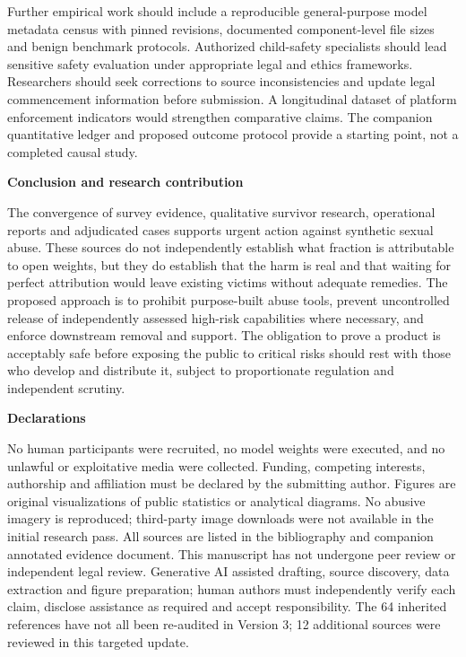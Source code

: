\documentclass[10pt,a4paper]{article}
\newcommand{\sub}[1]{\vspace{1mm}\textbf{#1}\par}
\begin{document}
Further empirical work should include a reproducible general-purpose model metadata census with pinned revisions, documented component-level file sizes and benign benchmark protocols. Authorized child-safety specialists should lead sensitive safety evaluation under appropriate legal and ethics frameworks. Researchers should seek corrections to source inconsistencies and update legal commencement information before submission. A longitudinal dataset of platform enforcement indicators would strengthen comparative claims. The companion quantitative ledger and proposed outcome protocol provide a starting point, not a completed causal study.


\sub{Conclusion and research contribution}
The convergence of survey evidence, qualitative survivor research, operational reports and adjudicated cases supports urgent action against synthetic sexual abuse. These sources do not independently establish what fraction is attributable to open weights, but they do establish that the harm is real and that waiting for perfect attribution would leave existing victims without adequate remedies. The proposed approach is to prohibit purpose-built abuse tools, prevent uncontrolled release of independently assessed high-risk capabilities where necessary, and enforce downstream removal and support. The obligation to prove a product is acceptably safe before exposing the public to critical risks should rest with those who develop and distribute it, subject to proportionate regulation and independent scrutiny.

\sub{Declarations}

No human participants were recruited, no model weights were executed, and no unlawful or exploitative media were collected. Funding, competing interests, authorship and affiliation must be declared by the submitting author. Figures are original visualizations of public statistics or analytical diagrams. No abusive imagery is reproduced; third-party image downloads were not available in the initial research pass. All sources are listed in the bibliography and companion annotated evidence document. This manuscript has not undergone peer review or independent legal review. Generative AI assisted drafting, source discovery, data extraction and figure preparation; human authors must independently verify each claim, disclose assistance as required and accept responsibility. The 64 inherited references have not all been re-audited in Version 3; 12 additional sources were reviewed in this targeted update.


\clearpage
{}
\end{document}
